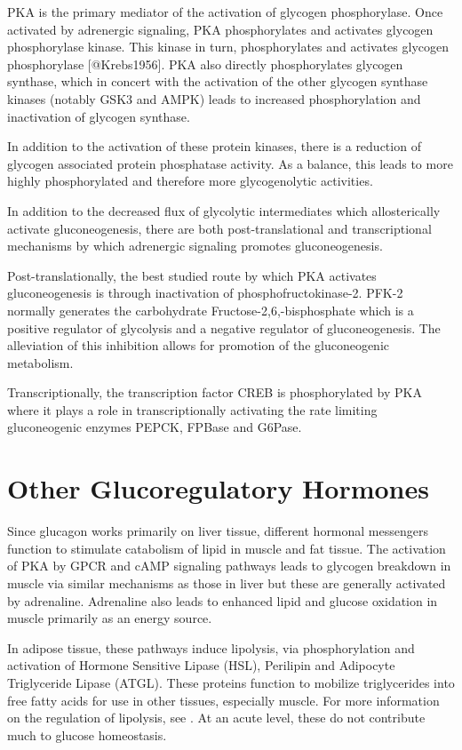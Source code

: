 \documentclass{tufte-handout}
\begin{document}
PKA is the primary mediator of the activation of glycogen phosphorylase.  Once activated by adrenergic signaling, PKA phosphorylates and activates glycogen phosphorylase kinase.  This kinase in turn, phosphorylates and activates glycogen phosphorylase [@Krebs1956].  PKA also directly phosphorylates glycogen synthase, which in concert with the activation of the other glycogen synthase kinases (notably GSK3 and AMPK) leads to increased phosphorylation and inactivation of glycogen synthase.

In addition to the activation of these protein kinases, there is a reduction of glycogen associated protein phosphatase activity.  As a balance, this leads to more highly phosphorylated and therefore more glycogenolytic activities.

  In addition to the decreased flux of glycolytic intermediates which allosterically activate gluconeogenesis, there are both post-translational and transcriptional mechanisms by which adrenergic signaling promotes gluconeogenesis.  

Post-translationally, the best studied route by which PKA activates gluconeogenesis is through inactivation of phosphofructokinase-2.  PFK-2 normally generates the carbohydrate Fructose-2,6,-bisphosphate which is a positive regulator of glycolysis and a negative regulator of gluconeogenesis.  The alleviation of this inhibition allows for promotion of the gluconeogenic metabolism.  

Transcriptionally, the transcription factor CREB is phosphorylated by PKA where it plays a role in transcriptionally activating the rate limiting gluconeogenic enzymes PEPCK, FPBase and G6Pase.

\section{Other Glucoregulatory Hormones}

Since glucagon works primarily on liver tissue, different hormonal messengers function to stimulate catabolism of lipid in muscle and fat tissue.  The activation of PKA by GPCR and cAMP signaling pathways leads to glycogen breakdown in muscle via similar mechanisms as those in liver but these are generally activated by adrenaline.  Adrenaline also leads to enhanced lipid and glucose oxidation in muscle primarily as an energy source.

In adipose tissue, these pathways induce lipolysis, via phosphorylation and activation of Hormone Sensitive Lipase (HSL), Perilipin and Adipocyte Triglyceride Lipase (ATGL).  These proteins function to mobilize triglycerides into free fatty acids for use in other tissues, especially muscle.  For more information on the regulation of lipolysis, see \cite{Young2013}.  At an acute level, these do not contribute much to glucose homeostasis.
\end{document}
